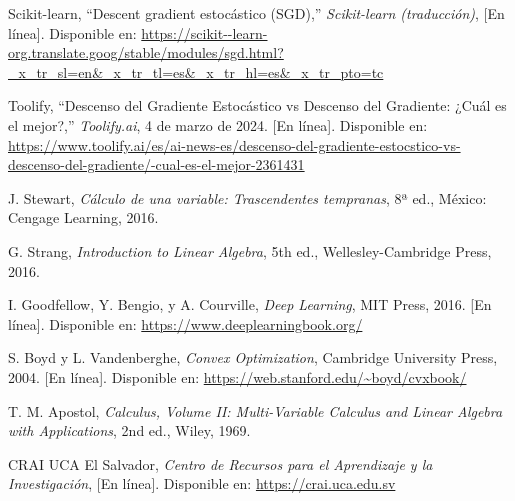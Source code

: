 \documentclass[12pt, letterpaper,conference]{IEEEtran}
\begin{document}
\begin{thebibliography}{1}
Scikit-learn, ``Descent gradient estocástico (SGD),'' \textit{Scikit-learn (traducción)}, [En línea]. Disponible en: \url{https://scikit--learn-org.translate.goog/stable/modules/sgd.html?_x_tr_sl=en&_x_tr_tl=es&_x_tr_hl=es&_x_tr_pto=tc}

Toolify, ``Descenso del Gradiente Estocástico vs Descenso del Gradiente: ¿Cuál es el mejor?,'' \textit{Toolify.ai}, 4 de marzo de 2024. [En línea]. Disponible en: \url{https://www.toolify.ai/es/ai-news-es/descenso-del-gradiente-estocstico-vs-descenso-del-gradiente/-cual-es-el-mejor-2361431}

J. Stewart, \textit{Cálculo de una variable: Trascendentes tempranas}, 8ª ed., México: Cengage Learning, 2016.

G. Strang, \textit{Introduction to Linear Algebra}, 5th ed., Wellesley-Cambridge Press, 2016.

I. Goodfellow, Y. Bengio, y A. Courville, \textit{Deep Learning}, MIT Press, 2016. [En línea]. Disponible en: \url{https://www.deeplearningbook.org/}

S. Boyd y L. Vandenberghe, \textit{Convex Optimization}, Cambridge University Press, 2004. [En línea]. Disponible en: \url{https://web.stanford.edu/~boyd/cvxbook/}

T. M. Apostol, \textit{Calculus, Volume II: Multi-Variable Calculus and Linear Algebra with Applications}, 2nd ed., Wiley, 1969.



CRAI UCA El Salvador, \textit{Centro de Recursos para el Aprendizaje y la Investigación}, [En línea]. Disponible en: \url{https://crai.uca.edu.sv}


\end{thebibliography}
\end{document}
